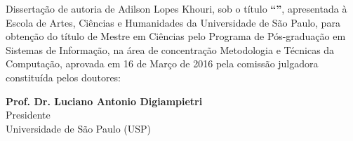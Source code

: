 \documentclass[
	12pt,				%
	oneside,			%
	a4paper,			%
	english,			%
	brazil				%
	]{abntex2ppgsi}
\numberwithin{equation}{section}
\begin{document}

\begin{folhadeaprovacao}
%
%
%
%
\noindent Dissertação de autoria de Adilson Lopes Khouri, sob o título \textbf{``\imprimirtitulo''}, apresentada à Escola de Artes, Ciências e Humanidades da Universidade de São Paulo, para obtenção do título de Mestre em Ciências pelo Programa de Pós-graduação em Sistemas de Informação, na área de concentração Metodologia e Técnicas da Computação, aprovada em 16 de Março de 2016 pela comissão julgadora constituída pelos doutores:

\vspace*{3cm}

\begin{center}
%
% 
% 
%
% 
% 
% 
%
%
\textbf{Prof. Dr. Luciano Antonio Digiampietri} 
\\ Presidente 
\\ Universidade de São Paulo (USP) 


\end{center}
\end{folhadeaprovacao}
\end{document}
